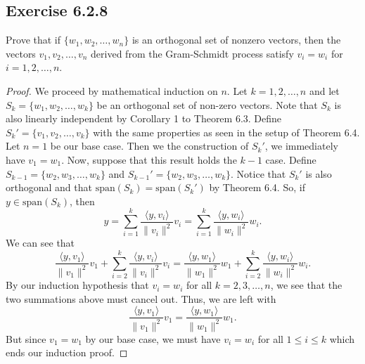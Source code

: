 \subsection*{Exercise 6.2.8} Prove that if \( \{ {w}_{1}, {w}_{2}, \dots, {w}_{n} \}  \) is an orthogonal set of nonzero vectors, then the vectors \( {v}_{1}, {v}_{2}, \dots, {v}_{n} \) derived from the Gram-Schmidt process satisfy \( {v}_{i} = {w}_{i} \) for \( i = 1,2,\dots, n \).
\begin{proof}
    We proceed by mathematical induction on \( n  \). Let \(  k = 1,2,\dots, n \) and let \( S_k = \{ {w}_{1}, {w}_{2}, \dots, {w}_{k} \}  \) be an orthogonal set of non-zero vectors. Note that \( S_k  \) is also linearly independent by Corollary 1 to Theorem 6.3. Define \( {S}_{k}' = \{ {v}_{1}, {v}_{2}, \dots, {v}_{k} \}  \) with the same properties as seen in the setup of Theorem 6.4. Let \(  n = 1  \) be our base case. Then we the construction of \( {S}_{k}' \), we immediately have \( {v}_{1} = {w}_{1} \). Now, suppose that this result holds the \( k - 1  \) case. Define \( {S}_{k-1} = \{ {w}_{2}, {w}_{3}, \dots, {w}_{k} \}  \) and \( {S}_{k-1}' = \{ {w}_{2}, {w}_{3}, \dots, {w}_{k} \}  \). Notice that \( {S}_{k}' \) is also orthogonal and that \( \text{span}(S_k) = \text{span}({S}_{k}') \) by Theorem 6.4. So, if \( y \in \text{span}({S}_{k}) \), then
    \[  y = \sum_{ i=1  }^{ k  } \frac{ \langle y , {v}_{i} \rangle  }{ \|{v}_{i}\|^{2} } {v}_{i} = \sum_{ i=1  }^{ k  } \frac{ \langle y , {w}_{i} \rangle }{ \|{w}_{i}\|^{2} } {w}_{i}. \]
    We can see that 
    \[  \frac{ \langle y , {v}_{1} \rangle }{  \|{v}_{1}\|^{2} } {v}_{1}  + \sum_{ i=2  }^{ k } \frac{ \langle y , {v}_{i} \rangle }{ \|{v}_{i}\|^{2} } {v}_{i} =  \frac{ \langle y , {w}_{1}  \rangle }{ \|{w}_{1}\|^{2} } {w}_{1} + \sum_{ i=2  }^{ k  } \frac{ \langle y , {w}_{i} \rangle }{ \|{w}_{i}\|^{2} } {w}_{i}.   \]
    By our induction hypothesis that \( {v}_{i} = {w}_{i}  \) for all \( k = 2,3, \dots, n \), we see that the two summations above must cancel out. Thus, we are left with
    \[  \frac{ \langle y , {v}_{1} \rangle }{ \|{v}_{1}\|^{2} }  {v}_{1} = \frac{ \langle y , {w}_{1} \rangle }{ \|{w}_{1}\|^{2} } {w}_{1}. \]
    But since \( {v}_{1} = {w}_{1} \) by our base case, we must have \( {v}_{i} = {w}_{i}  \) for all \( 1 \leq i \leq k  \) which ends our induction proof. 
\end{proof}

